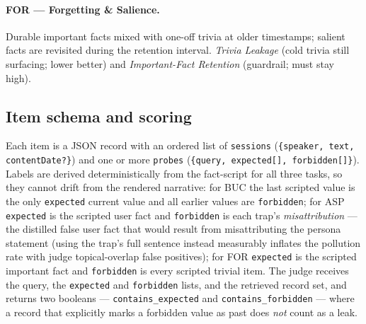 \documentclass[11pt]{article}
\begin{document}
\paragraph{FOR --- Forgetting \& Salience.} Durable important facts mixed with one-off
trivia at older timestamps; salient facts are revisited during the retention interval.
\textit{Trivia Leakage} (cold trivia still surfacing; lower better) and
\textit{Important-Fact Retention} (guardrail; must stay high).
\subsection{Item schema and scoring}
Each item is a JSON record with an ordered list of \texttt{sessions}
(\texttt{\{speaker, text, contentDate?\}}) and one or more \texttt{probes}
(\texttt{\{query, expected[], forbidden[]\}}). Labels are derived deterministically from
the fact-script for all three tasks, so they cannot drift from the rendered narrative:
for BUC the last scripted value is the only \texttt{expected} current value and all earlier
values are \texttt{forbidden}; for ASP \texttt{expected} is the scripted user fact and
\texttt{forbidden} is each trap's \emph{misattribution} --- the distilled false user fact
that would result from misattributing the persona statement (using the trap's full sentence
instead measurably inflates the pollution rate with judge topical-overlap false positives);
for FOR \texttt{expected} is the scripted important fact and \texttt{forbidden} is every
scripted trivial item. The judge receives the query, the \texttt{expected} and
\texttt{forbidden} lists, and the retrieved record set, and returns two booleans ---
\texttt{contains\_expected} and \texttt{contains\_forbidden} --- where a record that
explicitly marks a forbidden value as past does \emph{not} count as a leak.
\end{document}
